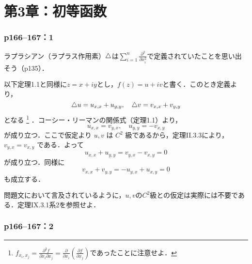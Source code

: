 \part*{第3章：初等函数}

\section*{p166--167：1}\label{p166--167：1}

ラプラシアン（ラプラス作用素）${\mathop{}\!\mathbin\bigtriangleup}$は$\sum_{i=1}^n \frac{\partial^2}{\partial x_i^2}$で定義されていたことを思い出そう（p135）．

\begin{tproof}
    以下定理1.1と同様に$z = x + iy$とし，$f(z) = u + iv$と書く．このとき定義より，
    \[
        {\mathop{}\!\mathbin\bigtriangleup} u = u_{x, x} + u_{y, y},
        \quad {\mathop{}\!\mathbin\bigtriangleup} v = v_{x, x} + v_{y,y}
    \]
    となる%
    \footnote{%
        $f_{x_i, x_j} = \frac{\partial^2 f}{\partial x_i \partial x_j} = \frac{\partial}{\partial x_i} \left(\frac{\partial f}{\partial x_j} \right)$であったことに注意せよ．%
    }%
    ．コーシー・リーマンの関係式（定理1.1）より，
    \[
        u_{x, x} = v_{y, x}, \quad u_{y, y} = -v_{x, y}
    \]
    が成り立つ．ここで仮定より $u, v$ は $C^2$ 級であるから，定理II.3.3により，$v_{y, x} = v_{x, y}$ である．よって
    \[
        u_{x, x} + u_{y, y} = v_{y, x} - v_{x, y} = 0
    \]
    が成り立つ．同様に
    \[
        v_{x, x} + v_{y, y} = -u_{y, x} + u_{x, y} = 0
    \]
    も成立する．
\end{tproof}

問題文において言及されているように，$u, v$の$C^2$級との仮定は実際には不要である．定理IX.3.1系2を参照せよ．


\section*{p166--167：2}\label{p166--167：2}


